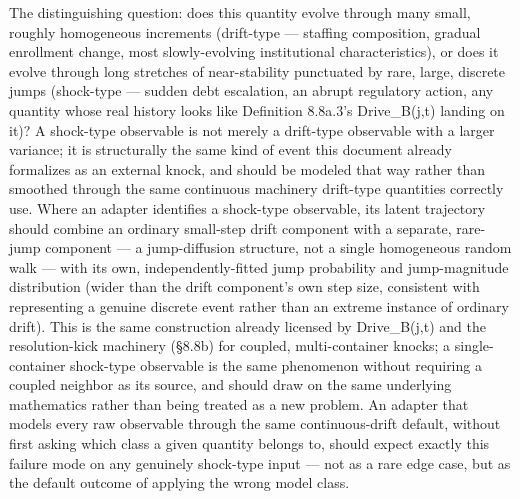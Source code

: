 \documentclass[
]{article}
\begin{document}
The distinguishing question: does this quantity evolve through many
small, roughly homogeneous increments (drift-type --- staffing
composition, gradual enrollment change, most slowly-evolving
institutional characteristics), or does it evolve through long stretches
of near-stability punctuated by rare, large, discrete jumps (shock-type
--- sudden debt escalation, an abrupt regulatory action, any quantity
whose real history looks like Definition 8.8a.3's Drive\_B(j,t) landing
on it)? A shock-type observable is not merely a drift-type observable
with a larger variance; it is structurally the same kind of event this
document already formalizes as an external knock, and should be modeled
that way rather than smoothed through the same continuous machinery
drift-type quantities correctly use. Where an adapter identifies a
shock-type observable, its latent trajectory should combine an ordinary
small-step drift component with a separate, rare-jump component --- a
jump-diffusion structure, not a single homogeneous random walk --- with
its own, independently-fitted jump probability and jump-magnitude
distribution (wider than the drift component's own step size, consistent
with representing a genuine discrete event rather than an extreme
instance of ordinary drift). This is the same construction already
licensed by Drive\_B(j,t) and the resolution-kick machinery (§8.8b) for
coupled, multi-container knocks; a single-container shock-type
observable is the same phenomenon without requiring a coupled neighbor
as its source, and should draw on the same underlying mathematics rather
than being treated as a new problem. An adapter that models every raw
observable through the same continuous-drift default, without first
asking which class a given quantity belongs to, should expect exactly
this failure mode on any genuinely shock-type input --- not as a rare
edge case, but as the default outcome of applying the wrong model class.
\end{document}
